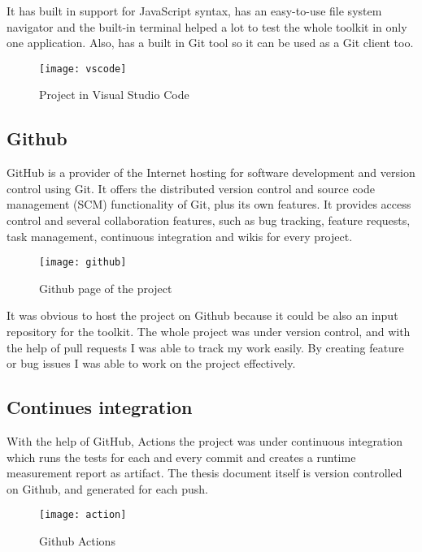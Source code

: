 It has built in support for JavaScript syntax, has an easy-to-use file system navigator and the built-in terminal helped a lot to test the whole toolkit in only one application. Also, has a built in Git tool so it can be used as a Git client too.

\begin{figure}[H]
	\centering
	\texttt{[image: vscode]}
	\caption{Project in Visual Studio Code}
	\label{fig:fig-studio}
\end{figure}

\newpage
\subsection{Github}

GitHub is a provider of the Internet hosting for software development and version control using Git. It offers the distributed version control and source code management (SCM) functionality of Git, plus its own features. It provides access control and several collaboration features, such as bug tracking, feature requests, task management, continuous integration and wikis for every project.\cite{gitbib}

\begin{figure}[H]
	\centering
	\texttt{[image: github]}
	\caption{Github page of the project}
	\label{fig:fig-github}
\end{figure}

It was obvious to host the project on Github because it could be also an input repository for the toolkit. The whole project was under version control, and with the help of pull requests I was able to track my work easily. By creating feature or bug issues I was able to work on the project effectively.

\newpage
\subsection{Continues integration}

With the help of GitHub, Actions the project was under continuous integration which runs the tests for each and every commit and creates a runtime measurement report as artifact. 
The thesis document itself is version controlled on Github, and generated for each push. 

\begin{figure}[H]
	\centering
	\texttt{[image: action]}
	\caption{Github Actions}
	\label{fig:fig-act}
\end{figure}


